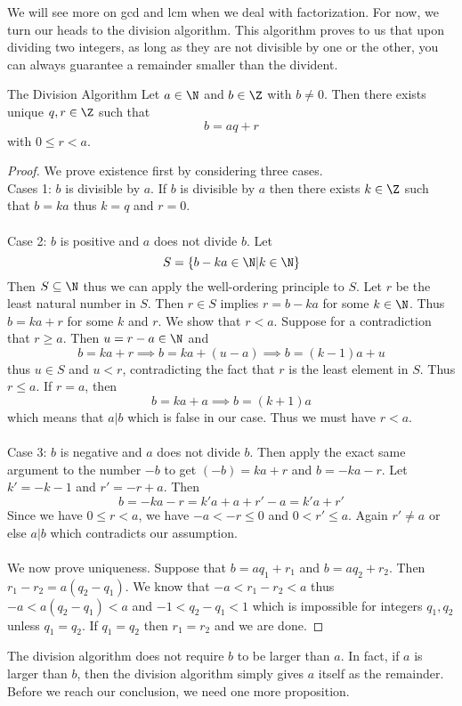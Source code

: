\documentclass[a4paper]{article}
\begin{document}
We will see more on gcd and lcm when we deal with factorization. For now, we turn our heads to the division algorithm. This algorithm proves to us that upon dividing two integers, as long as they are not divisible by one or the other, you can always guarantee a remainder smaller than the divident. 

\begin{thm}{The Division Algorithm}{} Let $a\in\N$ and $b\in\Z$ with $b\neq 0$. Then there exists unique $q,r\in\Z$ such that $$b=aq+r$$ with $0\leq r<a$. \tcbline
\begin{proof}
We prove existence first by considering three cases. \\
Cases 1: $b$ is divisible by $a$.  If $b$ is divisible by $a$ then there exists $k\in\Z$ such that $b=ka$ thus $k=q$ and $r=0$. \\~\\
Case 2: $b$ is positive and $a$ does not divide $b$. Let $$S=\{b-ka\in\N|k\in\N\}$$ Then $S\subseteq\N$ thus we can apply the well-ordering principle to $S$. Let $r$ be the least natural number in $S$. Then $r\in S$ implies $r=b-ka$ for some $k\in\N$. Thus $b=ka+r$ for some $k$ and $r$. We show that $r<a$. Suppose for a contradiction that $r\geq a$. Then $u=r-a\in\N$ and $$b=ka+r\implies b=ka+(u-a)\implies b=(k-1)a+u$$ thus $u\in S$ and $u<r$, contradicting the fact that $r$ is the least element in $S$. Thus $r\leq a$. If $r=a$, then $$b=ka+a\implies b=(k+1)a$$ which means that $a|b$ which is false in our case. Thus we must have $r<a$. \\~\\
Case 3: $b$ is negative and $a$ does not divide $b$. Then apply the exact same argument to the number $-b$ to get $(-b)=ka+r$ and $b=-ka-r$. Let $k'=-k-1$ and $r'=-r+a$. Then $$b=-ka-r=k'a+a+r'-a=k'a+r'$$ Since we have $0\leq r<a$, we have $-a<-r\leq 0$ and $0<r'\leq a$. Again $r'\neq a$ or else $a|b$ which contradicts our assumption. \\~\\
We now prove uniqueness. Suppose that $b=aq_1+r_1$ and $b=aq_2+r_2$. Then $r_1-r_2=a(q_2-q_1)$. We know that $-a<r_1-r_2<a$ thus $-a<a(q_2-q_1)<a$ and $-1<q_2-q_1<1$ which is impossible for integers $q_1,q_2$ unless $q_1=q_2$. If $q_1=q_2$ then $r_1=r_2$ and we are done. 
\end{proof}
\end{thm}

The division algorithm does not require $b$ to be larger than $a$. In fact, if $a$ is larger than $b$, then the division algorithm simply gives $a$ itself as the remainder. Before we reach our conclusion, we need one more proposition. 
\end{document}
